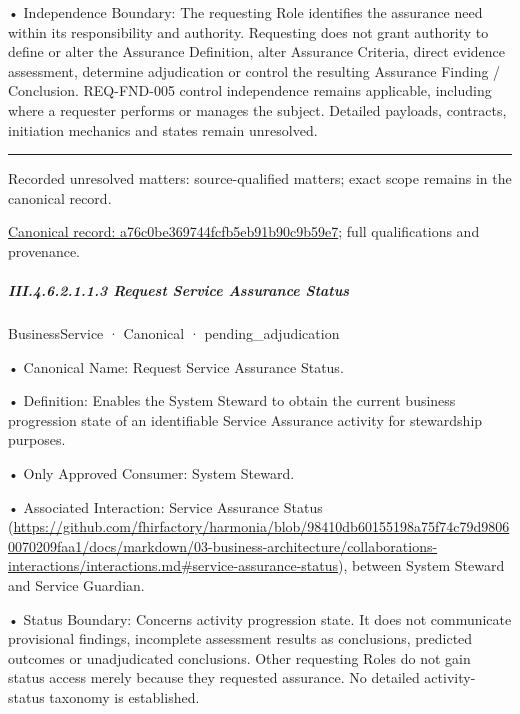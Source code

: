 •
Independence Boundary: The requesting Role identifies the assurance need within its responsibility and authority. Requesting does not grant authority to define or alter the Assurance Definition, alter Assurance Criteria, direct evidence assessment, determine adjudication or control the resulting Assurance Finding / Conclusion. REQ-FND-005 control independence remains applicable, including where a requester performs or manages the subject. Detailed payloads, contracts, initiation mechanics and states remain unresolved.



\medskip\hrule\medskip

{\small Recorded unresolved matters: source-qualified matters; exact scope remains in the canonical record.}\par
{\footnotesize \href{../../../../continuum/business/business-service/a76c0be369744fcfb5eb91b90c9b59e7.md}{Canonical record: a76c0be369744fcfb5eb91b90c9b59e7}; full qualifications and provenance.}\par
\subparagraph*{III.4.6.2.1.1.3 Request Service Assurance Status}
\label{navigation:III.4.6.2.1.1.3}

\label{element:60f8cbc814614f669f31d4e78734c6d6}
{\small BusinessService · Canonical · pending\_adjudication}\par

•
Canonical Name: Request Service Assurance Status.



•
Definition: Enables the System Steward to obtain the current business progression state of an identifiable Service Assurance activity for stewardship purposes.



•
Only Approved Consumer: System Steward.



•
Associated Interaction: Service Assurance Status (\url{https://github.com/fhirfactory/harmonia/blob/98410db60155198a75f74c79d98060070209faa1/docs/markdown/03-business-architecture/collaborations-interactions/interactions.md#service-assurance-status}), between System Steward and Service Guardian.



•
Status Boundary: Concerns activity progression state. It does not communicate provisional findings, incomplete assessment results as conclusions, predicted outcomes or unadjudicated conclusions. Other requesting Roles do not gain status access merely because they requested assurance. No detailed activity-status taxonomy is established.



